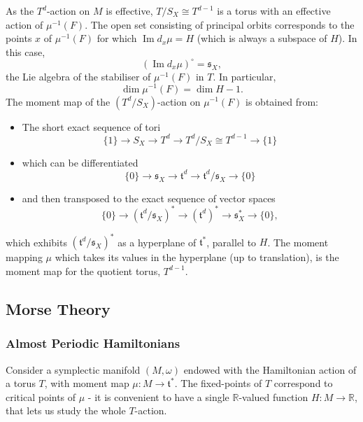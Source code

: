 \documentclass{article}
\newcommand{\ra}{\rightarrow}
\newcommand{\lra}{\longrightarrow}
\newcommand{\w}{\omega}
\newcommand{\RR}{\mathbb{R}}
\newcommand{\mft}{\mathfrak{t}}
\newcommand{\mf}[1]{\mathfrak{#1}}
\DeclareMathOperator{\Image}{Im}
\begin{document}
	As the $T^{d}$-action on $M$ is effective, $T/S_{X} \cong T^{d-1}$ is a torus with an effective action of $\mu^{-1}(F)$. The open set consisting of principal orbits corresponds to the points $x$ of $\mu^{-1}(F)$ for which $\Image d_{x}\mu = H$ (which is always a subspace of $H$). In this case,
	\[
		(\Image d_{x}\mu)^{\circ} = \mf{s}_{X},
	\]
	the Lie algebra of the stabiliser of $\mu^{-1}(F)$ in $T$. In particular,
	\[
		\dim \mu^{-1}(F) = \dim H - 1. 
	\]
	The moment map of the $(T^{d}/S_{X})$-action on $\mu^{-1}(F)$ is obtained from:
	
	\begin{itemize}
		\item The short exact sequence of tori
		\[
			\{1\} \lra S_{X} \lra T^{d} \lra T^{d}/S_{X} \cong T^{d-1} \lra \{1\}
		\]
		\item which can be differentiated
		\[
			\{0\} \lra \mf{s}_{X} \lra \mft^{d} \lra \mft^{d}/\mf{s}_{X} \ra \{0\}
		\]
		\item and then transposed to the exact sequence of vector spaces
		\[
			\{0\} \lra  (\mft^{d}/\mf{s}_{X})^{\ast} \lra (\mft^{d})^{\ast} \lra \mf{s}_{X}^{\ast} \lra \{0\},
		\]
	\end{itemize}
	which exhibits $(\mft^{d}/\mf{s}_{X})^{\ast}$ as a hyperplane of $\mft^{\ast}$, parallel to $H$. The moment mapping $\mu$ which takes its values in the hyperplane (up to translation), is the moment map for the quotient torus, $T^{d-1}$.
	
	
	
	
	
	
	
	
	
	
	
	
	
	
	
	
	
	
	
	
	
	
	
	
	
	
	
	
	\subsection{Morse Theory}

	\subsubsection{Almost Periodic Hamiltonians}
	
	Consider a symplectic manifold $(M, \w)$ endowed with the Hamiltonian action of a torus $T$, with moment map $\mu : M \ra \mft^{\ast}$. The fixed-points of $T$ correspond to critical points of $\mu$ - it is convenient to have a single $\RR$-valued function $H : M \ra \RR$, that lets us study the whole $T$-action.
	
\end{document}
